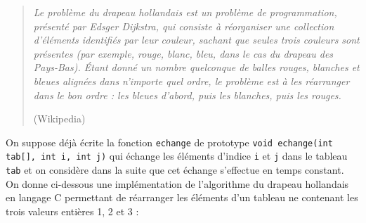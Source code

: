 \documentclass[11pt,a4paper]{article}
\begin{document}
\begin{Exercise}[title={Algorithme du drapeau hollandais}]
    \begin{quote}
    \og{} \textit{Le problème du drapeau hollandais est un problème de programmation, présenté par Edsger Dijkstra, qui consiste à réorganiser une collection d'éléments identifiés par leur couleur, sachant que seules trois couleurs sont présentes (par exemple, rouge, blanc, bleu, dans le cas du drapeau des Pays-Bas).
    Étant donné un nombre quelconque de balles rouges, blanches et bleues alignées dans n'importe quel ordre, le problème est à les réarranger dans le bon ordre : les bleues d'abord, puis les blanches, puis les rouges.}\fg{}
    \begin{flushright}
        (Wikipedia)
    \end{flushright}
    \end{quote}
    On suppose déjà écrite la fonction {\tt echange} de prototype \texttt{void echange(int tab[], int i, int j)} qui échange les éléments d'indice {\tt i} et {\tt j} dans le tableau {\tt tab} et on considère dans la suite que cet échange s'effectue en temps constant. On donne ci-dessous une implémentation de  l'algorithme du drapeau hollandais en langage C permettant de réarranger les éléments d'un tableau ne contenant les trois valeurs entières 1, 2 et 3  :
\end{Exercise}
\end{document}
